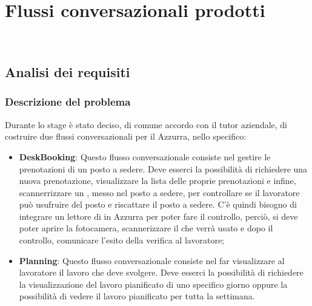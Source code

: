 
\chapter{Flussi conversazionali prodotti}
\label{cap:flussi di conversazione}

\\

\section{Analisi dei requisiti}
\subsection{Descrizione del problema}
Durante lo stage è stato deciso, di comune accordo con il tutor aziendale, di costruire due flussi conversazionali per il  Azzurra, nello specifico:
\begin{itemize}
	\item \textbf{DeskBooking}: Questo flusso conversazionale consiste nel gestire le prenotazioni di un posto a sedere. Deve esserci la possibilità di richiedere una nuova prenotazione, visualizzare la lista delle proprie prenotazioni e infine, scannerrizzare un ,  messo nel posto a sedere, per controllare se il lavoratore può usufruire del posto e riscattare il posto a sedere. C'è quindi bisogno di integrare un lettore di  in Azzurra per poter fare il controllo, perciò, si deve poter aprire la fotocamera, scannerizzare il  che verrà usato e dopo il controllo, comunicare l'esito della verifica al lavoratore;
	\item \textbf{Planning}: Questo flusso conversazionale consiste nel far visualizzare al lavoratore il lavoro che deve svolgere. Deve esserci la possibilità di richiedere la visualizzazione del lavoro pianificato di uno specifico giorno oppure la possibilità di vedere il lavoro pianificato per tutta la settimana.
\end{itemize}
